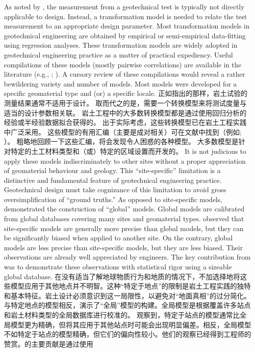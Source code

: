 \begin{Parallel}{0.60\textwidth}{}
{    }
    \ParallelPar
    \ParallelLText
    {
        As noted by \citet{Phoon1999612}, the measurement from a geotechnical test is typically not directly applicable to design. Instead, a transformation model is needed to relate the test measurement to an appropriate design parameter. Most transformation models in geotechnical engineering are obtained by empirical or semi-empirical data-fitting using regression analyses. These transformation models are widely adopted in geotechnical engineering practice as a matter of practical expediency. Useful compilations of these models (mostly pairwise correlations) are available in the literature (e.g., \citealp{Kulhawy1990}; \citealp{Mayne2001}). A cursory review of these compilations would reveal a rather bewildering variety and number of models. Most models were developed for a specific geomaterial type and (or) a specific locale.
    }
    \ParallelRText
    {
        正如\citet{Phoon1999612}指出的那样，岩土试验的测量结果通常不适用于设计。 取而代之的是，需要一个转换模型来将测试度量与适当的设计参数相关联。 岩土工程中的大多数转换模型都是通过使用回归分析的经验或半经验数据拟合获得的。 出于实际考虑，这些转换模型已在岩土工程实践中广泛采用。 这些模型的有用汇编（主要是成对相关）可在文献中找到（例如\citealp{Kulhawy1990}; \citealp{Mayne2001}）。 粗略地回顾一下这些汇编，将会发现令人困惑的各种模型。 大多数模型是针对特定的土工材料类型和（或）特定的区域设置而开发的。
    }
    \ParallelPar
    \ParallelLText
    {
        It is not judicious to apply these models indiscriminately to other sites without a proper appreciation of geomaterial behaviour and geology. This “site-specific” limitation is a distinctive and fundamental feature of geotechnical engineering practice. Geotechnical design must take cognizance of this limitation to avoid gross oversimplification of “ground truths.” As opposed to site-specific models, \citet{Ching201252} demonstrated the construction of “global” models. Global models are calibrated from global databases covering many sites and geomaterial types. \citet{Ching201252} observed that site-specific models are generally more precise than global models, but they can be significantly biased when applied to another site. On the contrary, global models are less precise than site-specific models, but they are less biased. Their observations are already well appreciated by engineers. The key contribution from \citet{Ching201252} was to demonstrate these observations with statistical rigor using
        a sizeable global database.
    }
    \ParallelRText
    {
        在没有适当了解地球物质行为和地质的情况下，不加选择地将这些模型应用于其他地点并不明智。这种“特定于地点”的限制是岩土工程实践的独特和基本特征。岩土设计必须意识到这一局限性，以避免对“地面真相”的过分简化。与特定地点的模型相反，\citet{Ching201252}演示了“全局”模型的构建。全局模型是根据覆盖许多站点和岩土材料类型的全局数据库进行校准的。 \citet{Ching201252}观察到，特定于站点的模型通常比全局模型更为精确，但将其应用于其他站点时可能会出现明显偏差。相反，全局模型不如特定于站点的模型精确，但它们的偏向性较小。他们的观察已经得到工程师的赞赏。\citet{Ching201252}的主要贡献是通过使用
}
\end{Parallel}
